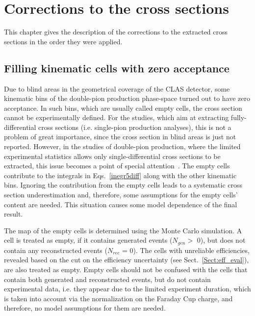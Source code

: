 \chapter{Corrections to the cross sections}
\label{Sect:corr_cr_sect}

This chapter gives the description of the corrections to the extracted cross sections in the order they were applied.


\section{Filling kinematic cells with zero acceptance}
\label{Sect:empt_cells}

Due to blind areas in the geometrical coverage of the CLAS detector, some kinematic bins of the double-pion production phase-space turned out to have zero acceptance. In such bins, which are usually called empty cells, the cross section cannot be experimentally defined. For the studies, which aim at extracting fully-differential cross sections (i.e. single-pion production analyses), this is not a problem of great importance, since the cross section in blind areas is just not reported. However, in the studies of double-pion production, where the limited experimental statistics allows only single-differential cross sections to be extracted, this issue becomes a point of special attention~\cite{Fed_an_note:2007,Fedotov:2008aa,Fed_an_note:2017,Fed_paper_2018,Isupov:2017lnd,Arjun}. The empty cells contribute to the integrals in Eqs.~\eqref{inegr5diff} along with the other kinematic bins. Ignoring the contribution from the empty cells leads to a systematic cross section underestimation and, therefore, some assumptions for the empty cells' content are needed. This situation causes some model dependence of the final result. 


The map of the empty cells is determined using the Monte Carlo simulation. A cell is treated as empty, if it contains generated events ($N_{gen} >$ 0), but does not contain any reconstructed events ($N_{rec}$ = 0). The cells with unreliable efficiencies, revealed based on the cut on the efficiency uncertainty (see Sect.~\ref{Sect:eff_eval}), are also treated as empty. Empty cells should not be confused with the cells that contain both generated and reconstructed events, but do not contain experimental data, i.e. they appear due to the limited experiment duration, which is taken into account via the normalization on the Faraday Cup charge, and therefore, no model assumptions for them are needed. 


